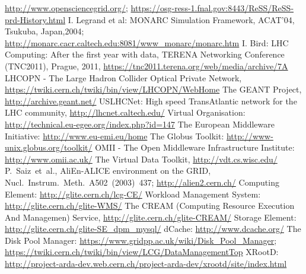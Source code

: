 \documentclass{intech}
\begin{document}
\begin{thebibliography}{100}
\newline\url{http://www.opensciencegrid.org/};
\newline\url{https://osg-ress-1.fnal.gov:8443/ReSS/ReSS-prd-History.html}
%
 I. Legrand et al: MONARC Simulation Framework, ACAT'04, Tsukuba, Japan,2004;
\newline\url{http://monarc.cacr.caltech.edu:8081/www_monarc/monarc.htm}
%
 I. Bird: LHC Computing: After the first year with data, TERENA
Networking Conference (TNC2011), Prague, 2011,
       \newline\url{https://tnc2011.terena.org/web/media/archive/7A}
%
 LHCOPN - The Large Hadron Collider Optical Private Network,
\newline\url{https://twiki.cern.ch/twiki/bin/view/LHCOPN/WebHome}
%
 The GEANT Project, \url{http://archive.geant.net/}
%
 USLHCNet: High speed TransAtlantic network for the LHC community,
\newline\url{http://lhcnet.caltech.edu/}
%
%
 Virtual Organisation: \url{http://technical.eu-egee.org/index.php?id=147}
%
 The European Middleware Initiative:
\url{http://www.eu-emi.eu/home}
%
 The Globus Toolkit: \url{http://www-unix.globus.org/toolkit/}
%
 OMII - The Open Middleware Infrastructure Institute:
\url{http://www.omii.ac.uk/}
%
 The Virtual Data Toolkit, \url{http://vdt.cs.wisc.edu/}
%
 P.~Saiz~et~al.,  AliEn-ALICE environment on the GRID,\\
Nucl.~Instrum.~Meth.~A502~(2003)~437; \url{http://alien2.cern.ch/}
%
 Computing Element: \url{http://glite.cern.ch/lcg-CE/}
%
 Workload Management System: \url{http://glite.cern.ch/glite-WMS/}
%
 The CREAM (Computing Resource Execution And Managemen) Service,
\newline\url{http://glite.cern.ch/glite-CREAM/}
%
 Storage Element: \url{http://glite.cern.ch/glite-SE_dpm_mysql/}
%
 dCache: \url{http://www.dcache.org/}
%
 The Disk Pool Manager:
\newline\url{https://www.gridpp.ac.uk/wiki/Disk_Pool_Manager};
\newline\url{https://twiki.cern.ch/twiki/bin/view/LCG/DataManagementTop}
%
 XRootD:
\newline\url{http://project-arda-dev.web.cern.ch/project-arda-dev/xrootd/site/index.html}

\end{thebibliography}
\end{document}
